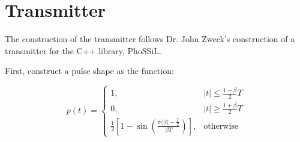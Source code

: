 \section{Transmitter} \label{sec_transmitter}

The construction of the transmitter follows Dr. John Zweck's construction of a transmitter for the C++ library, PhoSSiL.

First, construct a pulse shape as the function:

\begin{equation}
\label{eq_pulseshape}
p(t) = \left\{
\begin{array}{ll}
1, & |t| \le \frac{1-\beta}{2}T \\
0, & |t| \ge \frac{1+\beta}{2}T \\
\frac{1}{2}[1-\sin(\frac{\pi(|t|-\frac{T}{2}}{\beta T})], & \text{otherwise}
\end{array} \right.
\end{equation}